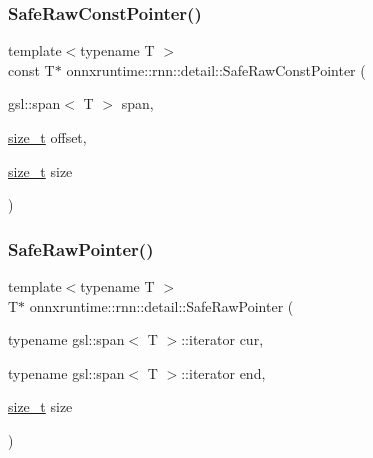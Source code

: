 \mbox{\label{namespaceonnxruntime_1_1rnn_1_1detail_abac03a9f5be0f301681ee7bbfd7ffc8e}} 
\subsubsection{\texorpdfstring{Safe\+Raw\+Const\+Pointer()}{SafeRawConstPointer()}\hspace{0.1cm}{\footnotesize\ttfamily [2/2]}}
{\footnotesize\ttfamily template$<$typename T $>$ \\
const T$\ast$ onnxruntime\+::rnn\+::detail\+::\+Safe\+Raw\+Const\+Pointer (\begin{DoxyParamCaption}\item[{gsl\+::span$<$ T $>$}]{span,  }\item[{\mbox{\hyperlink{mlasi_8h_a503efbc1c6e50825320ad909366b78ab}{size\+\_\+t}}}]{offset,  }\item[{\mbox{\hyperlink{mlasi_8h_a503efbc1c6e50825320ad909366b78ab}{size\+\_\+t}}}]{size }\end{DoxyParamCaption})}

\mbox{\label{namespaceonnxruntime_1_1rnn_1_1detail_a7eee4ee52633bb01c2e273ea709ac3e8}} 
\subsubsection{\texorpdfstring{Safe\+Raw\+Pointer()}{SafeRawPointer()}\hspace{0.1cm}{\footnotesize\ttfamily [1/2]}}
{\footnotesize\ttfamily template$<$typename T $>$ \\
T$\ast$ onnxruntime\+::rnn\+::detail\+::\+Safe\+Raw\+Pointer (\begin{DoxyParamCaption}\item[{typename gsl\+::span$<$ T $>$\+::iterator}]{cur,  }\item[{typename gsl\+::span$<$ T $>$\+::iterator}]{end,  }\item[{\mbox{\hyperlink{mlasi_8h_a503efbc1c6e50825320ad909366b78ab}{size\+\_\+t}}}]{size }\end{DoxyParamCaption})}

